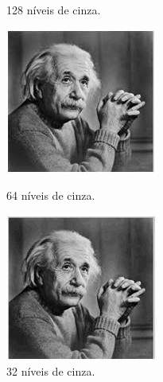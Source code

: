 \documentclass[a4paper, 12pt]{article}
\begin{document}
\begin{figure}[!htb]
	  	\caption{128 níveis de cinza.}
	\endminipage\hspace{1cm}
		\includegraphics[width=\linewidth]{images/64.jpg}
		\caption{64 níveis de cinza.}
  	\endminipage\hspace{1cm}
  		\includegraphics[width=\linewidth]{images/32.jpg}
  		\caption{32 níveis de cinza.}
	\endminipage
\end{figure}
\end{document}
